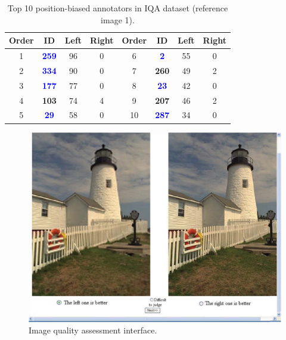 \documentclass[10pt,journal,cspaper,compsoc]{IEEEtran}
\begin{document}
{{\renewcommand\baselinestretch{1.1}\selectfont
\setlength{\belowcaptionskip}{0pt}
\begin{table}[h]\caption{\label{tab:ref1} Top 10 position-biased annotators in IQA dataset (reference image 1).}
\tiny
\centering
\begin{lrbox}{\tablebox}
\begin{tabular}{||c|c|c|c||c|c|c|c||}
  \hline  \textbf{Order} &\textbf{ID}   &\textbf{Left}  &\textbf{Right} & \textbf{Order} & \textbf{ID}   &\textbf{Left}  &\textbf{Right} \\
 \hline
 \hline  1 & \textcolor{blue}{\textbf{259}}    &96     &0  & 6 & \textcolor{blue}{\textbf{2}}   &55     &0 \\
\hline  2 & \textcolor{blue}{\textbf{334}}     &90    & 0  & 7 & \textbf{260}    & 49     &2\\
 \hline  3 & \textcolor{blue}{\textbf{177}}   &77     &0   & 8 & \textcolor{blue}{\textbf{23}}    &42     &0 \\
 \hline 4 & \textbf{103}  &74     &4  &9  & \textbf{207}    &46     &2\\
 \hline 5 & \textcolor{blue}{\textbf{29}}  &58     &0  & 10 & \textcolor{blue}{\textbf{287}}   &34     &0\\



 \hline
\end {tabular}
\medskip
\end{lrbox}
\scalebox{1}{\usebox{\tablebox}}
\end{table}
\par}

\begin{figure}[h]
 \begin{center}
\includegraphics[width=0.7\linewidth]{iqa_test.png}
  \caption{Image quality assessment interface.} \label{iqa_test}
\end{center}
\end{figure}

}
\end{document}
